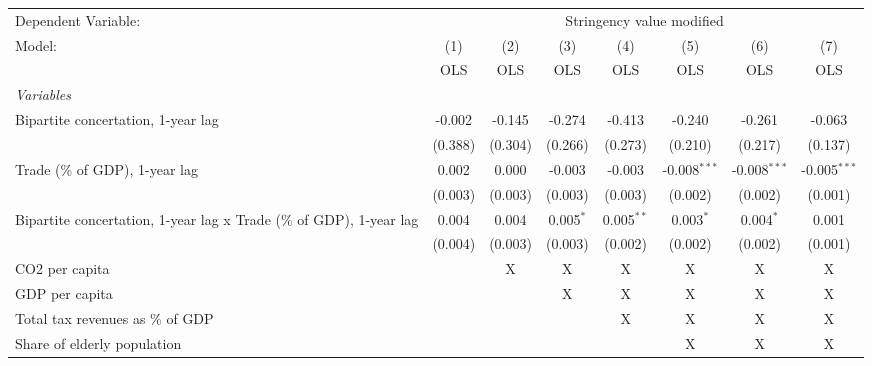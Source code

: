 
\begingroup
\centering
\begin{tabular}{lccccccc}
   \toprule
   Dependent Variable: & \multicolumn{7}{c}{Stringency value modified}\\
   Model:                                                              & (1)     & (2)     & (3)         & (4)          & (5)            & (6)            & (7)\\  
                                                                       &  OLS    & OLS     & OLS         & OLS          & OLS            & OLS            & OLS\\  
   \midrule
   \emph{Variables}\\
   Bipartite concertation, 1-year lag                                  & -0.002  & -0.145  & -0.274      & -0.413       & -0.240         & -0.261         & -0.063\\   
                                                                       & (0.388) & (0.304) & (0.266)     & (0.273)      & (0.210)        & (0.217)        & (0.137)\\   
   Trade (\% of GDP), 1-year lag                                       & 0.002   & 0.000   & -0.003      & -0.003       & -0.008$^{***}$ & -0.008$^{***}$ & -0.005$^{***}$\\   
                                                                       & (0.003) & (0.003) & (0.003)     & (0.003)      & (0.002)        & (0.002)        & (0.001)\\   
   Bipartite concertation, 1-year lag x Trade (\% of GDP), 1-year lag  & 0.004   & 0.004   & 0.005$^{*}$ & 0.005$^{**}$ & 0.003$^{*}$    & 0.004$^{*}$    & 0.001\\   
                                                                       & (0.004) & (0.003) & (0.003)     & (0.002)      & (0.002)        & (0.002)        & (0.001)\\   
   CO2 per capita                                                      &         & X       & X           & X            & X              & X              & X\\  
   GDP per capita                                                      &         &         & X           & X            & X              & X              & X\\  
   Total tax revenues as \% of GDP                                     &         &         &             & X            & X              & X              & X\\  
   Share of elderly population                                         &         &         &             &              & X              & X              & X\\  

\end{tabular}
